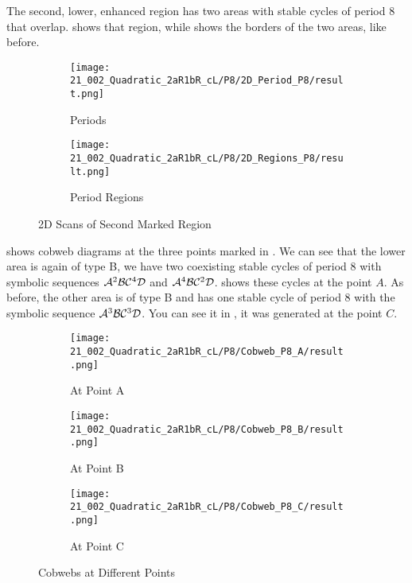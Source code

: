 The second, lower, enhanced region has two areas with stable cycles of period 8 that overlap.
 shows that region, while  shows the borders of the two areas, like before.

\begin{figure}
    \centering
    \begin{subfigure}{0.4\textwidth}
        \centering
        \texttt{[image: 21\_002\_Quadratic\_2aR1bR\_cL/P8/2D\_Period\_P8/result.png]}
        \caption{Periods}
        \label{fig:quadratic.full.2aR1bR_cL.2d.2}
    \end{subfigure}
    \begin{subfigure}{0.4\textwidth}
        \centering
        \texttt{[image: 21\_002\_Quadratic\_2aR1bR\_cL/P8/2D\_Regions\_P8/result.png]}
        \caption{Period Regions}
        \label{fig:quadratic.regions.2aR1bR_cL.2d.2}
    \end{subfigure}
    \caption{2D Scans of Second Marked Region}
\end{figure}

 shows cobweb diagrams at the three points marked in .
We can see that the lower area is again of type B, we have two coexisting stable cycles of period 8 with symbolic sequences $\mathcal{A}^2\mathcal{B}\mathcal{C}^4\mathcal{D}$ and $\mathcal{A}^4\mathcal{B}\mathcal{C}^2\mathcal{D}$.
 shows these cycles at the point $A$.
As before, the other area is of type B and has one stable cycle of period 8 with the symbolic sequence $\mathcal{A}^3\mathcal{B}\mathcal{C}^3\mathcal{D}$.
You can see it in , it was generated at the point $C$.

\begin{figure}
    \centering
    \begin{subfigure}{0.3\textwidth}
        \centering
        \texttt{[image: 21\_002\_Quadratic\_2aR1bR\_cL/P8/Cobweb\_P8\_A/result.png]}
        \caption{At Point A}
        \label{fig:quad.full.2aR1bR_cL.2.CobwebA}
    \end{subfigure}
    \begin{subfigure}{0.3\textwidth}
        \centering
        \texttt{[image: 21\_002\_Quadratic\_2aR1bR\_cL/P8/Cobweb\_P8\_B/result.png]}
        \caption{At Point B}
        \label{fig:quad.full.2aR1bR_cL.2.CobwebB}
    \end{subfigure}
    \begin{subfigure}{0.3\textwidth}
        \centering
        \texttt{[image: 21\_002\_Quadratic\_2aR1bR\_cL/P8/Cobweb\_P8\_C/result.png]}
        \caption{At Point C}
        \label{fig:quad.full.2aR1bR_cL.2.CobwebC}
    \end{subfigure}
    \caption{Cobwebs at Different Points}
    \label{fig:quad.full.2aR1bR_cL.2.Cobwebs}
\end{figure}
